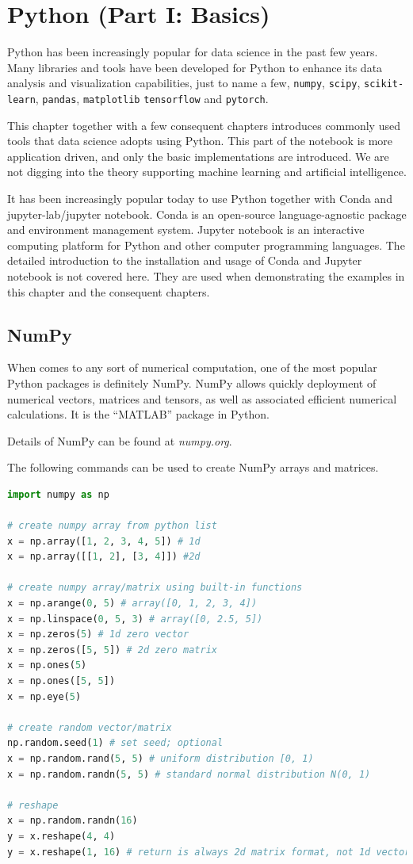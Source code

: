 \chapter{Python (Part I: Basics)} \label{ch:numpyscipy}

Python has been increasingly popular for data science in the past few years. Many libraries and tools have been developed for Python to enhance its data analysis and visualization capabilities, just to name a few, \verb|numpy|, \verb|scipy|, \verb|scikit-learn|, \verb|pandas|, \verb|matplotlib| \verb|tensorflow| and \verb|pytorch|.

This chapter together with a few consequent chapters introduces commonly used tools that data science adopts using Python. This part of the notebook is more application driven, and only the basic implementations are introduced. We are not digging into the theory supporting machine learning and artificial intelligence.

It has been increasingly popular today to use Python together with Conda and jupyter-lab/jupyter notebook. Conda is an open-source language-agnostic package and environment management system. Jupyter notebook is an interactive computing platform for Python and other computer programming languages. The detailed introduction to the installation and usage of Conda and Jupyter notebook is not covered here. They are used when demonstrating the examples in this chapter and the consequent chapters.

\section{NumPy}

When comes to any sort of numerical computation, one of the most popular Python packages is definitely NumPy. NumPy allows quickly deployment of numerical vectors, matrices and tensors, as well as associated efficient numerical calculations. It is the ``MATLAB'' package in Python.

Details of NumPy can be found at \textit{numpy.org}.

The following commands can be used to create NumPy arrays and matrices.
\begin{lstlisting}[language=Python]
import numpy as np

# create numpy array from python list
x = np.array([1, 2, 3, 4, 5]) # 1d
x = np.array([[1, 2], [3, 4]]) #2d

# create numpy array/matrix using built-in functions
x = np.arange(0, 5) # array([0, 1, 2, 3, 4])
x = np.linspace(0, 5, 3) # array([0, 2.5, 5])
x = np.zeros(5) # 1d zero vector
x = np.zeros([5, 5]) # 2d zero matrix
x = np.ones(5)
x = np.ones([5, 5])
x = np.eye(5)

# create random vector/matrix
np.random.seed(1) # set seed; optional
x = np.random.rand(5, 5) # uniform distribution [0, 1)
x = np.random.randn(5, 5) # standard normal distribution N(0, 1)

# reshape
x = np.random.randn(16)
y = x.reshape(4, 4)
y = x.reshape(1, 16) # return is always 2d matrix format, not 1d vector format
\end{lstlisting}

